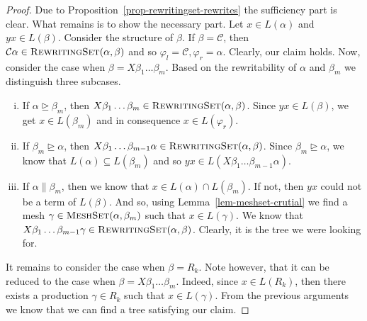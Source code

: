 \documentclass[11pt,a4paper]{amsart}
\theoremstyle{definition}
\newcommand{\RewritingSet}[2]{\textsc{RewritingSet}(#1,#2)}
\newcommand{\MeshSet}[2]{\textsc{MeshSet}(#1,#2)}
\begin{document}
\begin{proof}
        Due to Proposition~\ref{prop-rewritingset-rewrites} the sufficiency part
        is clear. What remains is to show the necessary part. Let $x \in
        L(\alpha)$ and $y x \in L(\beta)$. Consider the structure of
        $\beta$. If $\beta = \mathcal{C}$, then $\mathcal{C} \alpha \in
        \RewritingSet{\alpha}{\beta}$ and so $\varphi_l = \mathcal{C}, \varphi_r
        = \mathcal{\alpha}$.  Clearly, our claim holds. Now, consider the case
        when $\beta = X \beta_1 \ldots \beta_m$. Based on the rewritability of
        $\alpha$ and $\beta_m$ we distinguish three subcases.
        \begin{enumerate}[(i)]
            \item If $\alpha \trianglerighteq \beta_m$, then $X \beta_1 \ldots
                    \beta_m \in \RewritingSet{\alpha}{\beta}$. Since $y x 
                    \in L(\beta)$, we get $x \in L(\beta_m)$ and in
                     consequence $x \in L(\varphi_r)$.
            \item If $\beta_m \trianglerighteq \alpha$, then $X \beta_1 \ldots
                    \beta_{m-1} \alpha \in \RewritingSet{\alpha}{\beta}$. Since
                    $\beta_m \trianglerighteq \alpha$, we know that $L(\alpha)
                    \subseteq L(\beta_m)$ and so $y x \in 
                    L(X \beta_1 \ldots \beta_{m-1} \alpha)$.
            \item If $\alpha \parallel \beta_m$, then we know that $x \in
                    L(\alpha) \cap L(\beta_m)$. If not, then $y x$ could not be
                    a term of $L(\beta)$. And so, using Lemma~\ref{lem-meshset-crutial}
                    we find a
                    mesh $\gamma \in \MeshSet{\alpha}{\beta_m}$ such that $x \in
                    L(\gamma)$. We know that $X \beta_1 \ldots \beta_{m-1}
                    \gamma \in \RewritingSet{\alpha}{\beta}$. Clearly, it is the
                    tree we were looking for.
        \end{enumerate}

        It remains to consider the case when $\beta = R_k$. Note however, that
        it can be reduced to the case when $\beta = X \beta_1 \ldots \beta_m$.
        Indeed, since $x \in L(R_k)$, then there exists a production $\gamma \in
        R_k$ such that $x \in L(\gamma)$. From the previous arguments we
        know that we can find a tree satisfying our claim.
\end{proof}
\end{document}
